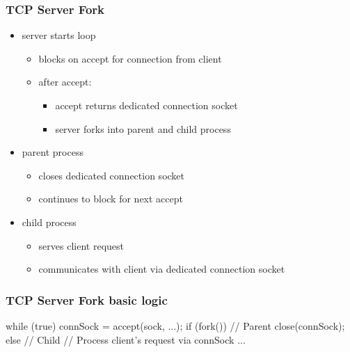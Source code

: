 \documentclass{report}
\begin{document}
    \subsubsection{TCP Server Fork}
    \begin{itemize}
        \item server starts loop
            \begin{itemize}
                \item blocks on accept for connection from client
                \item after accept:
                    \begin{itemize}
                        \item accept returns dedicated connection socket
                        \item server forks into parent and child process
                    \end{itemize}
            \end{itemize}
        \item parent process
            \begin{itemize}
                \item closes dedicated connection socket
                \item continues to block for next accept
            \end{itemize}
        \item child process
            \begin{itemize}
                \item serves client request
                \item communicates with client via dedicated connection socket
            \end{itemize}
    \end{itemize}

    \bigbreak \noindent 
    \subsubsection{TCP Server Fork basic logic}
    \bigbreak \noindent 
    \begin{cppcode}
        while (true) {
            connSock = accept(sock, ...);
            if (fork()) { // Parent 
                close(connSock);
            } else { // Child
                // Process client's request via connSock
                ...
            }
        }
    \end{cppcode}
\end{document}

